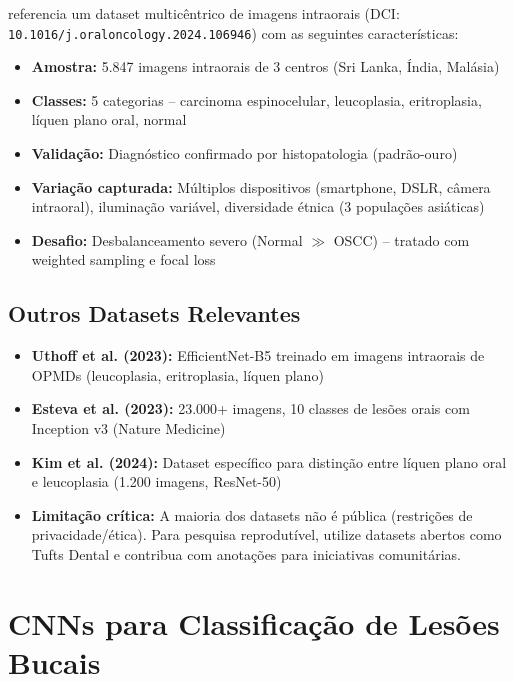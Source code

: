  referencia um dataset multicêntrico de imagens intraorais
(DCI: \texttt{10.1016/j.oraloncology.2024.106946}) com as seguintes
características:

\begin{itemize}
  \item \textbf{Amostra:} 5.847 imagens intraorais de 3 centros (Sri Lanka, Índia, Malásia)
  \item \textbf{Classes:} 5 categorias -- carcinoma espinocelular, leucoplasia,
        eritroplasia, líquen plano oral, normal
  \item \textbf{Validação:} Diagnóstico confirmado por histopatologia (padrão-ouro)
  \item \textbf{Variação capturada:} Múltiplos dispositivos (smartphone, DSLR,
        câmera intraoral), iluminação variável, diversidade étnica (3 populações asiáticas)
  \item \textbf{Desafio:} Desbalanceamento severo (Normal $\gg$ OSCC) --
        tratado com weighted sampling e focal loss
\end{itemize}

\subsection{Outros Datasets Relevantes}

\begin{itemize}
  \item \textbf{Uthoff et al. (2023):} EfficientNet-B5 treinado em imagens
        intraorais de OPMDs (leucoplasia, eritroplasia, líquen plano)
  \item \textbf{Esteva et al. (2023):} 23.000+ imagens, 10 classes de lesões
        orais com Inception v3 (Nature Medicine)
  \item \textbf{Kim et al. (2024):} Dataset específico para distinção entre
        líquen plano oral e leucoplasia (1.200 imagens, ResNet-50)
  \item \textbf{Limitação crítica:} A maioria dos datasets não é pública
        (restrições de privacidade/ética). Para pesquisa reprodutível, utilize
        datasets abertos como Tufts Dental e contribua com anotações para
        iniciativas comunitárias.
\end{itemize}

\section{CNNs para Classificação de Lesões Bucais}
\label{sec:cnns-lesoes}

